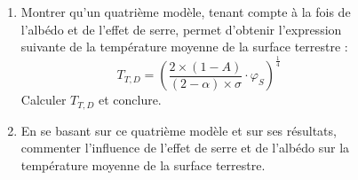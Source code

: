 \documentclass[a4paper,11pt,fleqn]{article}%
\begin{document}
\begin{figure}[h!]
\begin{enumerate}
		\item Montrer qu'un quatrième modèle, tenant compte à la fois de l'albédo et de l'effet de serre, permet d'obtenir l'expression suivante de la température moyenne de la surface terrestre : $$T_{T,D} = \left( \dfrac{2\times (1-A)}{(2-\alpha)\times \sigma}\cdot \varphi_S\right)^{\frac{1}{4}}$$
		Calculer $T_{T,D}$ et conclure.
		\item En se basant sur ce quatrième modèle et sur ses résultats, commenter l'influence de l'effet de serre et de l'albédo sur la température moyenne de la surface terrestre.
	\end{enumerate}
\end{figure}
\end{document}
